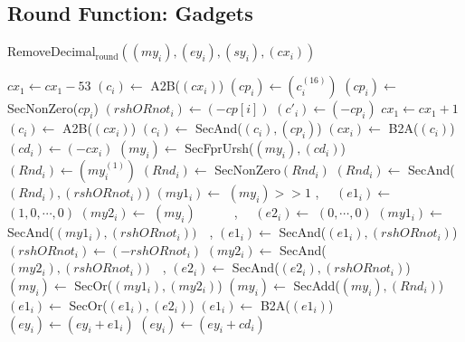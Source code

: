 \documentclass[runningheads]{llncs}
\begin{document}
\newpage
\subsection*{Round Function: Gadgets}

\begin{algorithm}
  \caption{RemoveDecimal$_{\text{round}}((my_i), (ey_i), (sy_i), (cx_i))$}
  $cx_1 \leftarrow cx_1 - 53$
  $(c_i) \leftarrow$ A2B($(cx_i)$)\;
  $(cp_i) \leftarrow (c_i^{(16)})$\;
  $(cp_i) \leftarrow$ SecNonZero($cp_i$)\;
  $(rshORnot_i) \leftarrow (-cp[i])$\; 
  $(c'_i) \leftarrow (- cp_i)$
  $cx_1 \leftarrow cx_1 + 1$\;
  $(c_i) \leftarrow$ A2B($(cx_i)$)\;
  $(c_i) \leftarrow$ SecAnd($(c_i), (cp_i)$)\;
  $(cx_i) \leftarrow$ B2A($(c_i)$)\;
  $(cd_i) \leftarrow (-cx_i)$\;
  $(my_i) \leftarrow$ SecFprUrsh($(my_i), (cd_i)$)
  $(Rnd_i) \leftarrow (my_i^{(1)})$\;
  $(Rnd_i) \leftarrow$ SecNonZero$(Rnd_i)$\;
  $(Rnd_i) \leftarrow$ SecAnd($(Rnd_i), (rshORnot_i)$)\;
  $(my1_i) \leftarrow$ $(my_i)>>1$ , $\quad (e1_i) \leftarrow$ $(1,0,\cdots, 0)$\;
  $(my2_i) \leftarrow$ $(my_i)\qquad \quad$,  $\quad(e2_i) \leftarrow$ $(0,\cdots, 0)$\;
  $(my1_i) \leftarrow$ SecAnd($(my1_i), (rshORnot_i))\quad $, $(e1_i) \leftarrow$ SecAnd($(e1_i), (rshORnot_i)$)\;
  $(rshORnot_i) \leftarrow (-rshORnot_i)$\;
  $(my2_i) \leftarrow$ SecAnd($(my2_i), (rshORnot_i))\quad $, $(e2_i) \leftarrow$ SecAnd($(e2_i), (rshORnot_i)$)\;
  $(my_i) \leftarrow$ SecOr($(my1_i), (my2_i)$)\;
  $(my_i) \leftarrow$ SecAdd($(my_i), (Rnd_i)$)\;
  $(e1_i) \leftarrow$ SecOr($(e1_i), (e2_i)$)\;
  $(e1_i) \leftarrow$ B2A($(e1_i)$)\; 
  $(ey_i) \leftarrow (ey_i + e1_i) $\;
  $(ey_i) \leftarrow (ey_i + cd_i)$\; 
\;
\end{algorithm}
\end{document}

